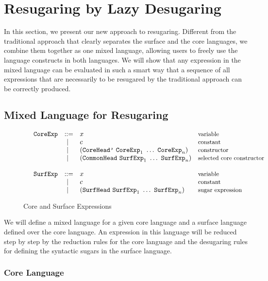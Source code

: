 
\section{Resugaring by Lazy Desugaring}
\label{sec3}

In this section, we present our new approach to resugaring. Different from the traditional approach that clearly separates the surface and the core languages, we combine them together as one mixed language, allowing users to freely use the language constructs in both languages. We will show that any expression in the mixed language can be evaluated in such a smart way that a sequence of all expressions that are necessarily to be resugared by the traditional approach can be correctly produced.

\subsection{Mixed Language for Resugaring}

\begin{figure}[t]
	\[
	\begin{array}{lllll}
	 &\mbox{\tt CoreExp} &::=& x  & \mbox{{\small variable}}\\
	       &&~|~& c  & \mbox{{\small constant}}\\
				 &&~|~& (\mbox{\tt CoreHead'}~\mbox{\tt CoreExp}_1~\ldots~\mbox{\tt CoreExp}_n) & \mbox{{\small constructor}}\\
				 &&~|~& (\mbox{\tt CommonHead}~\mbox{\tt SurfExp}_1~\ldots~\mbox{\tt SurfExp}_n) & \mbox{{\small selected core constructor}}\\
	\\
	 &\mbox{\tt SurfExp} &::=& x  & \mbox{{\small variable}}\\
	       &&~|~& c  & \mbox{{\small constant}}\\
				 &&~|~& (\mbox{\tt SurfHead}~\mbox{\tt SurfExp}_1~\ldots~\mbox{\tt SurfExp}_n) & \mbox{{\small sugar expression}}
	\end{array}
	\]
	\caption{Core and Surface Expressions}
	\label{fig:expression}
\end{figure}

We will define a mixed language for a given core language and a surface language defined over the core language. An expression in this language will be reduced step by step by the reduction rules for the core language and the desugaring rules for defining the syntactic sugars in the surface language.

\subsubsection{Core Language}

